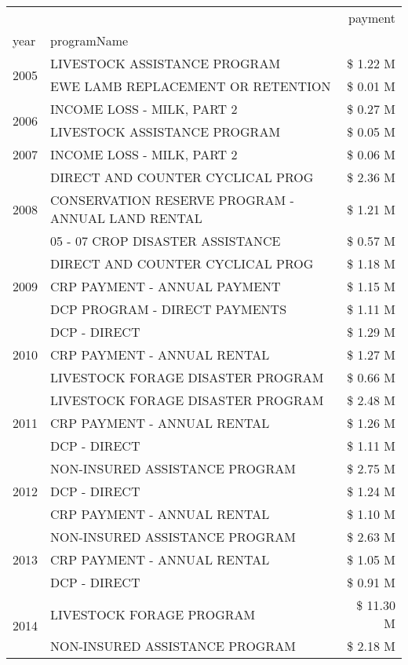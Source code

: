 \begin{tabular}{llr}
\toprule
 &  & payment \\
year & programName &  \\
\midrule
\multirow[t]{2}{*}{2005} & LIVESTOCK ASSISTANCE PROGRAM & \$ 1.22 M \\
 & EWE LAMB REPLACEMENT OR RETENTION & \$ 0.01 M \\
\cline{1-3}
\multirow[t]{2}{*}{2006} & INCOME LOSS - MILK, PART 2 & \$ 0.27 M \\
 & LIVESTOCK ASSISTANCE PROGRAM & \$ 0.05 M \\
\cline{1-3}
2007 & INCOME LOSS - MILK, PART 2 & \$ 0.06 M \\
\cline{1-3}
\multirow[t]{3}{*}{2008} & DIRECT AND COUNTER CYCLICAL PROG & \$ 2.36 M \\
 & CONSERVATION RESERVE PROGRAM - ANNUAL LAND RENTAL & \$ 1.21 M \\
 & 05 - 07 CROP DISASTER ASSISTANCE & \$ 0.57 M \\
\cline{1-3}
\multirow[t]{3}{*}{2009} & DIRECT AND COUNTER CYCLICAL PROG & \$ 1.18 M \\
 & CRP PAYMENT - ANNUAL PAYMENT & \$ 1.15 M \\
 & DCP PROGRAM - DIRECT PAYMENTS & \$ 1.11 M \\
\cline{1-3}
\multirow[t]{3}{*}{2010} & DCP - DIRECT & \$ 1.29 M \\
 & CRP PAYMENT - ANNUAL RENTAL & \$ 1.27 M \\
 & LIVESTOCK FORAGE DISASTER PROGRAM & \$ 0.66 M \\
\cline{1-3}
\multirow[t]{3}{*}{2011} & LIVESTOCK FORAGE DISASTER PROGRAM & \$ 2.48 M \\
 & CRP PAYMENT - ANNUAL RENTAL & \$ 1.26 M \\
 & DCP - DIRECT & \$ 1.11 M \\
\cline{1-3}
\multirow[t]{3}{*}{2012} & NON-INSURED ASSISTANCE PROGRAM & \$ 2.75 M \\
 & DCP - DIRECT & \$ 1.24 M \\
 & CRP PAYMENT - ANNUAL RENTAL & \$ 1.10 M \\
\cline{1-3}
\multirow[t]{3}{*}{2013} & NON-INSURED ASSISTANCE PROGRAM & \$ 2.63 M \\
 & CRP PAYMENT - ANNUAL RENTAL & \$ 1.05 M \\
 & DCP - DIRECT & \$ 0.91 M \\
\cline{1-3}
\multirow[t]{3}{*}{2014} & LIVESTOCK FORAGE PROGRAM & \$ 11.30 M \\
 & NON-INSURED ASSISTANCE PROGRAM & \$ 2.18 M \\

\end{tabular}
